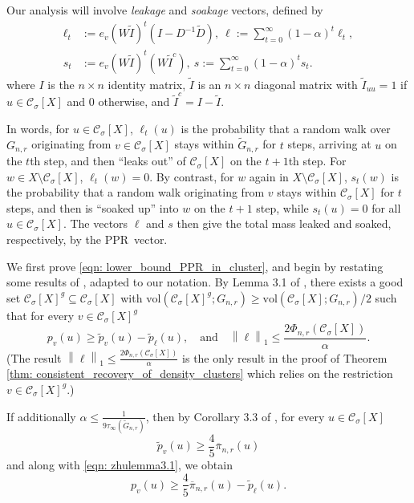 \documentclass[11pt,twoside]{article}
\theoremstyle{definition}
\newcommand{\vol}{\mathrm{vol}}
\newcommand{\norm}[1]{\left\lVert#1\right\rVert}
\newcommand{\1}{\mathbbm{1}}
\newcommand{\pbf}{p}        %
\newcommand{\pibf}{\pi}
\newcommand{\Xbf}{X}
\newcommand{\Wbf}{W}
\newcommand{\Dbf}{D}
\newcommand{\Cset}{\mathcal{C}}
\newcommand{\Csig}{\Cset_{\sigma}}
\newcommand{\pprspace}{{\sc PPR~}}
\newcommand{\wDbf}{\widetilde{\Dbf}}
\begin{document}
	Our analysis will involve \emph{leakage} and \emph{soakage} vectors, defined by
	\begin{align}
	\label{eqn: leakage_soakage}
	\ell_t & := e_v (\Wbf \widetilde{I} )^t (I - \Dbf^{-1} \wDbf),~ \ell := \sum_{t = 0}^{\infty} (1 - \alpha)^t \ell_t, \nonumber \\
	s_t & := e_v (\Wbf \widetilde{I} )^t (\Wbf \widetilde{I}^c),~ s := \sum_{t = 0}^{\infty} (1 - \alpha)^{t} s_t.
	\end{align}
	where $I$ is the $n \times n$ identity matrix, $\widetilde{I}$ is an $n \times n$ diagonal matrix with $\widetilde{I}_{uu} = 1$ if $u \in \Csig[\Xbf]$ and $0$ otherwise, and $\widetilde{I}^c = I - \widetilde{I}$.
	
	In words, for $u \in \Csig[\Xbf]$, $\ell_t(u)$ is the probability that a random walk over $G_{n,r}$ originating from $v \in \Csig[\Xbf]$ stays within $\widetilde{G}_{n,r}$ for $t$ steps, arriving at $u$ on the $t$th step, and then ``leaks out'' of $\Csig[\Xbf]$ on the $t + 1$th step. For $w \in \Xbf \setminus \Csig[\Xbf]$, $\ell_t(w) = 0$. By contrast, for $w$ again in $\Xbf \setminus \Csig[\Xbf]$, $s_t(w)$ is the probability that a random walk originating from $v$ stays within $\Csig[\Xbf]$ for $t$ steps, and then is ``soaked up'' into $w$ on the $t + 1$ step, while $s_t(u) = 0$ for all $u \in \Csig[\Xbf]$. The vectors $\ell$ and $s$ then give the total mass leaked and soaked, respectively, by the \pprspace vector. 
	
	We first prove \eqref{eqn: lower_bound_PPR_in_cluster}, and begin by restating some results of \citep{zhu2013}, adapted to our notation. By Lemma 3.1 of \citep{zhu2013}, there exists a good set $\Csig[\Xbf]^g \subseteq \Csig[\Xbf]$ with $\vol(\Csig[\Xbf]^g; G_{n,r}) \geq \vol(\Csig[\Xbf]; G_{n,r})/2$ such that for every $v \in \Csig[\Xbf]^g$
	\begin{equation}
	\label{eqn: zhulemma3.1}
	\pbf_v(u) \geq \widetilde{\pbf}_v(u) - \widetilde{\pbf}_{\ell}(u), \quad \textrm{and} \quad \norm{\ell}_1 \leq \frac{2 \Phi_{n,r}(\Csig[\Xbf])}{\alpha}.
	\end{equation}
	(The result $\norm{\ell}_1 \leq \frac{2 \Phi_{n,r}(\Csig[\Xbf])}{\alpha}$ is the only result in the proof of Theorem \ref{thm: consistent_recovery_of_density_clusters} which relies on the restriction $v \in \Csig[\Xbf]^g$.)
	
	If additionally $\alpha \leq \frac{1}{9\tau_{\infty}(\widetilde{G}_{n,r})}$, then by Corollary 3.3 of \citep{zhu2013}, for every $u \in \Csig[\Xbf]$
	\begin{equation*}
	\widetilde{\pbf}_v(u) \geq \frac{4}{5} \overline{\pibf}_{n,r}(u)
	\end{equation*}
	and along with \eqref{eqn: zhulemma3.1}, we obtain
	\begin{equation*}
	\pbf_v(u) \geq \frac{4}{5} \overline{\pibf}_{n,r}(u) - \widetilde{\pbf}_{\ell}(u).
	\end{equation*}
	
\end{document}
